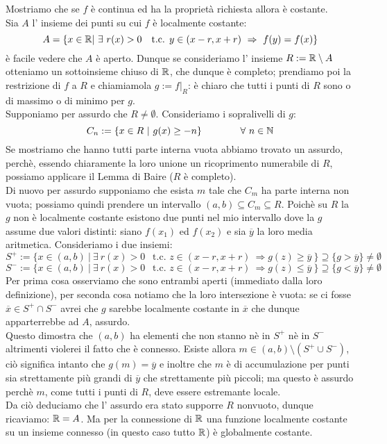  Mostriamo che se $f$ è continua ed ha la proprietà richiesta allora è costante.\\
Sia $A$ l' insieme dei punti su cui $f$ è localmente costante:
$$
A=\{x\in\RR \vert\ \exists\  r(x)>0\ \ \mbox{ t.c. } y\in(x-r,x+r)\ \Rightarrow  \ f(y)=f(x)\}
$$ 
è facile vedere che $A$ è aperto. Dunque se consideriamo l' insieme $R:=\mathbb{R}\setminus A$ otteniamo un sottoinsieme chiuso di $\mathbb{R}$, che dunque è completo; prendiamo poi la restrizione di $f$ a $R$ e chiamiamola $g:=f\vert_R$: è chiaro che tutti i punti di $R$ sono o di massimo o di minimo per $g$.\\
Supponiamo per assurdo che $R\neq \emptyset$. Consideriamo i sopralivelli di $g$:
$$
C_n:=\{x\in R\ \vert\ g(x)\geq -n\}\qquad \qquad \forall\ n\in \mathbb{N} 
$$ 
Se mostriamo che hanno tutti parte interna vuota abbiamo trovato un assurdo, perchè, essendo chiaramente la loro unione un ricoprimento numerabile di $R$, possiamo applicare il Lemma di Baire ($R$ è completo).\\
Di nuovo per assurdo supponiamo che esista $m$ tale che $C_m$ ha parte interna non vuota; possiamo quindi prendere un intervallo $(a,b)\subseteq C_m\subseteq R$. Poichè su $R$ la $g$ non è localmente costante esistono due punti nel mio intervallo dove la $g$ assume due valori distinti: siano $f(x_1)$ ed $f(x_2)$ e sia $\overline{y}$ la loro media aritmetica. Consideriamo i due insiemi:
$$
S^+:=\{x\in (a,b) \ \vert\ \exists\  r(x)>0\ \ \mbox{ t.c. } z\in(x-r,x+r)\ \Rightarrow g(z)\geq \overline{y} \ \}\supseteq \{g> \overline{y}\}\neq \emptyset
$$
$$
S^-:=\{x\in (a,b) \ \vert\ \exists\  r(x)>0\ \ \mbox{ t.c. } z\in(x-r,x+r)\ \Rightarrow g(z)\leq \overline{y} \ \}\supseteq \{g< \overline{y}\}\neq\emptyset
$$
Per prima cosa osserviamo che sono entrambi aperti (immediato dalla loro definizione), per seconda cosa notiamo che la loro intersezione è vuota: se ci fosse $\overline{x}\in S^+\cap S^-$ avrei che $g$ sarebbe localmente costante in $\overline{x}$ che dunque apparterrebbe ad $A$, assurdo.\\
Questo dimostra che $(a,b)$ ha elementi che non stanno nè in $S^+$ nè in $S^-$ altrimenti violerei il fatto che è connesso. Esiste allora $m\in(a,b)\setminus(S^+\cup S^-)$, ciò significa intanto che $g(m)=\overline{y}$ e inoltre che $m$ è di accumulazione per punti sia strettamente più grandi di $\overline{y}$ che strettamente più piccoli; ma questo è assurdo perchè $m$, come tutti i punti di $R$, deve essere estremante locale.\\
Da ciò deduciamo che l' assurdo era stato supporre $R$ nonvuoto, dunque ricaviamo: $\mathbb{R}=A$. Ma per la connessione di $\mathbb{R}$ una funzione localmente costante su un insieme connesso (in questo caso tutto $\mathbb{R}$) è globalmente costante.
